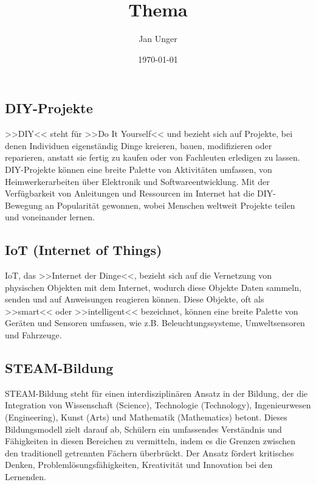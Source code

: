 \documentclass{vorlage-design-main}
\title{Thema}
\author{Jan Unger}
\date{\today}
\begin{document}
\maketitle

\begin{abstract}

\end{abstract}

\hypertarget{diy-projekte}{%
\subsection{DIY-Projekte}\label{diy-projekte}}

>>DIY<< steht für >>Do It Yourself<< und bezieht sich auf Projekte, bei
denen Individuen eigenständig Dinge kreieren, bauen, modifizieren oder
reparieren, anstatt sie fertig zu kaufen oder von Fachleuten erledigen
zu lassen. DIY-Projekte können eine breite Palette von Aktivitäten
umfassen, von Heimwerkerarbeiten über Elektronik und
Softwareentwicklung. Mit der Verfügbarkeit von Anleitungen und
Ressourcen im Internet hat die DIY-Bewegung an Popularität gewonnen,
wobei Menschen weltweit Projekte teilen und voneinander lernen.

\hypertarget{iot-internet-of-things}{%
\subsection{IoT (Internet of Things)}\label{iot-internet-of-things}}

IoT, das >>Internet der Dinge<<, bezieht sich auf die Vernetzung von
physischen Objekten mit dem Internet, wodurch diese Objekte Daten
sammeln, senden und auf Anweisungen reagieren können. Diese Objekte, oft
als >>smart<< oder >>intelligent<< bezeichnet, können eine breite
Palette von Geräten und Sensoren umfassen, wie z.B. Beleuchtungssysteme,
Umweltsensoren und Fahrzeuge.

\hypertarget{steam-bildung}{%
\subsection{STEAM-Bildung}\label{steam-bildung}}

STEAM-Bildung steht für einen interdisziplinären Ansatz in der Bildung,
der die Integration von Wissenschaft (Science), Technologie
(Technology), Ingenieurwesen (Engineering), Kunst (Arts) und Mathematik
(Mathematics) betont. Dieses Bildungsmodell zielt darauf ab, Schülern
ein umfassendes Verständnis und Fähigkeiten in diesen Bereichen zu
vermitteln, indem es die Grenzen zwischen den traditionell getrennten
Fächern überbrückt. Der Ansatz fördert kritisches Denken,
Problemlösungsfähigkeiten, Kreativität und Innovation bei den Lernenden.
\end{document}
